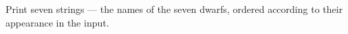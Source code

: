 Print seven strings --- the names of the seven dwarfs, ordered according to their appearance in the input.
